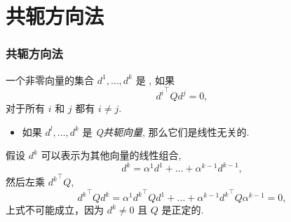 \documentclass{beamer}
\begin{document}
	\section{共轭方向法}
	\begin{frame}
		\frametitle{\secno 共轭方向法}
		
	     一个非零向量的集合 $d^1,\dots,d^k$ 是 , 如果
		\begin{equation}
			{d^i}^{\top}Q{d^j}=0,
		\end{equation}
		对于所有 $i$ 和 $j$ 都有 $i \neq j$.
		
		
			\begin{itemize}
				\item 如果 $d^l,\dots,d^k$ 是 \emph{Q共轭向量}, 那么它们是线性无关的.
			\end{itemize}
 假设 $d^k$ 可以表示为其他向量的线性组合, $$d^k={\alpha}^1 d^1+\dots +{\alpha}^{k-1}d^{k-1},$$ 然后左乘 ${d^k}^{\top} Q$,$${d^k}^{\top}Q{d^k}={\alpha}^1{d^k}^{\top}Qd^1+
				\dots+{\alpha}^{k-1}{d^k}^{\top}Q{\alpha}^{k-1}=0,$$上式不可能成立，因为 $d^k\neq 0$ 且 $Q$ 是正定的.
			
		
		
	\end{frame}
\end{document}
